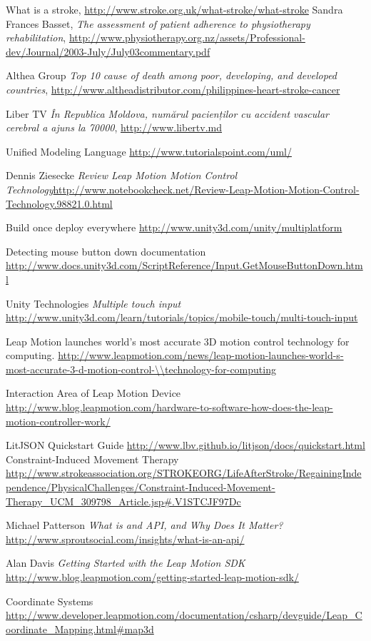 \begin{thebibliography}{99999}
\singlespace\normalsize

 What is a stroke, \url{http://www.stroke.org.uk/what-stroke/what-stroke}
 Sandra Frances Basset, \textit{ The assessment of patient adherence to physiotherapy
rehabilitation}, \url {http://www.physiotherapy.org.nz/assets/Professional-dev/Journal/2003-July/July03commentary.pdf}

 Althea Group \textit{ Top 10 cause of death among poor, developing, and developed countries}, \url {http://www.altheadistributor.com/philippines-heart-stroke-cancer}

 Liber TV \textit{În Republica Moldova, numărul pacienților cu accident vascular cerebral a ajuns la 70000}, \url{http://www.libertv.md}


 Unified Modeling Language \url{http://www.tutorialspoint.com/uml/}

 Dennis Ziesecke \textit{Review Leap Motion Motion Control Technology}\url {http://www.notebookcheck.net/Review-Leap-Motion-Motion-Control-Technology.98821.0.html}

 Build once deploy everywhere \url {http://www.unity3d.com/unity/multiplatform}

 Detecting mouse button down documentation \url {http://www.docs.unity3d.com/ScriptReference/Input.GetMouseButtonDown.html}

 Unity Technologies \textit{Multiple touch input} \url{http://www.unity3d.com/learn/tutorials/topics/mobile-touch/multi-touch-input}



Leap Motion launches world's most accurate 3D motion control technology for computing.
 \url{http://www.leapmotion.com/news/leap-motion-launches-world-s-most-accurate-3-d-motion-control-\\technology-for-computing}
 
  Interaction Area of Leap Motion Device \url{http://www.blog.leapmotion.com/hardware-to-software-how-does-the-leap-motion-controller-work/}
 
  LitJSON Quickstart Guide \url {http://www.lbv.github.io/litjson/docs/quickstart.html}
 Constraint-Induced Movement Therapy \url{http://www.strokeassociation.org/STROKEORG/LifeAfterStroke/RegainingIndependence/PhysicalChallenges/Constraint-Induced-Movement-Therapy_UCM_309798_Article.jsp#.V1STCJF97Dc}

 Michael Patterson \textit{What is and API, and Why Does It Matter?} \url {http://www.sproutsocial.com/insights/what-is-an-api/}

 Alan Davis \textit{Getting Started with the Leap Motion SDK} \url{http://www.blog.leapmotion.com/getting-started-leap-motion-sdk/}

 Coordinate Systems \url{http://www.developer.leapmotion.com/documentation/csharp/devguide/Leap_Coordinate_Mapping.html#map3d}
\end{thebibliography}
